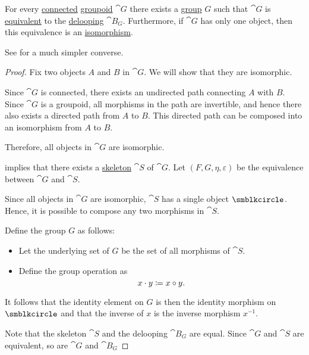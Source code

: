 \begin{proposition}\label{thm:connected_delooping}
  For every \hyperref[def:connected_category]{connected} \hyperref[def:groupoid]{groupoid} \( \cat{G} \) there exists a \hyperref[def:group]{group} \( G \) such that \( \cat{G} \) is \hyperref[def:category_equivalence]{equivalent} to the \hyperref[def:monoid_delooping]{delooping} \( \cat{B}_G \). Furthermore, if \( \cat{G} \) has only one object, then this equivalence is an \hyperref[rem:category_similarity/isomorphism]{isomorphism}.
\end{proposition}
\begin{comments}
  \item See  for a much simpler converse.
\end{comments}
\begin{proof}
   Fix two objects \( A \) and \( B \) in \( \cat{G} \). We will show that they are isomorphic.

  Since \( \cat{G} \) is connected, there exists an undirected path connecting \( A \) with \( B \). Since \( \cat{G} \) is a groupoid, all morphisms in the path are invertible, and hence there also exists a directed path from \( A \) to \( B \). This directed path can be composed into an isomorphism from \( A \) to \( B \).

  Therefore, all objects in \( \cat{G} \) are isomorphic.

    implies that there exists a \hyperref[def:skeletal_category]{skeleton} \( \cat{S} \) of \( \cat{G} \). Let \( (F, G, \eta, \varepsilon) \) be the equivalence between \( \cat{G} \) and \( \cat{S} \).

  Since all objects in \( \cat{G} \) are isomorphic, \( \cat{S} \) has a single object \( \anon \). Hence, it is possible to compose any two morphisms in \( \cat{S} \).

  Define the group \( G \) as follows:
  \begin{itemize}
    \item Let the underlying set of \( G \) be the set of all morphisms of \( \cat{S} \).
    \item Define the group operation as
    \begin{equation*}
      x \cdot y \coloneqq x \bincirc y.
    \end{equation*}
  \end{itemize}

  It follows that the identity element on \( G \) is then the identity morphism on \( \anon \) and that the inverse of \( x \) is the inverse morphism \( x^{-1} \).

   Note that the skeleton \( \cat{S} \) and the delooping \( \cat{B}_G \) are equal. Since \( \cat{G} \) and \( \cat{S} \) are equivalent, so are \( \cat{G} \) and \( \cat{B}_G \)
\end{proof}

